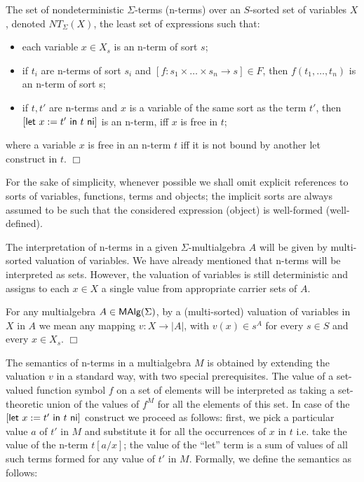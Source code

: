 \begin{Definition} 
The set of nondeterministic $\Sigma$-terms (n-terms) over an $S$-sorted 
set of variables $X$, denoted $NT_\Sigma(X)$, the least set of expressions 
such that:
\begin{itemize} 
\item{each variable $x \in X_s$ is an n-term of sort $s$;} 
\item{if $t_i$ are n-terms of sort $s_i$ and 
      $[f:s_1 \times \ldots \times s_n \rightarrow s] \in F$, 
      then $f(t_1, \ldots, t_n)$ is an n-term of sort s;} 
\item{if $t,t'$ are n-terms and $x$ is a variable of the same sort 
      as the term $t'$, then $[{\sf let}\ x := t'\ {\sf in}\ t\ {\sf ni}]$ is an n-term, iff $x$ is 
      free in $t$;}
\end{itemize}
where a variable $x$ is free in an n-term $t$ iff it is not bound by 
another {\sf let} construct in  $t$.
\hfill$\Box$ 
\end{Definition}
%
For the sake of simplicity, whenever possible we shall omit explicit
references to sorts of variables, functions, terms and objects; the
implicit sorts are always assumed to be such that the considered
expression (object) is well-formed (well-defined).

The interpretation of n-terms in a given $\Sigma$-multialgebra $A$
will be given by multi-sorted valuation of variables. We have already
mentioned that n-terms will be interpreted as sets. However, the
valuation of variables is still deterministic and assigns to each $x
\in X$ a single value from appropriate carrier sets of $A$.

\begin{Definition}
For any multialgebra $A\in \mbox{\rm\sf MAlg}(\Sigma)$, by a (multi-sorted)
valuation of variables in $X$ in $A$ we mean any mapping $v: X
\rightarrow |A|$, with $v(x)\in s^{A}$ for every $s\in S$ and every
$x\in X_s$.
\hfill$\Box$ 
\end{Definition}
%
The semantics of n-terms in a multialgebra $M$ is obtained by
extending the valuation $v$ in a standard way, with two special
prerequisites. The value of a set-valued function symbol $f$ on a set
of elements will be interpreted as taking a set-theoretic union of the
values of $f^M$ for all the elements of this set. In case of the
$[{\sf let}\ x := t'\ {\sf in}\ t\ {\sf ni}]$ construct we proceed as follows: first, we pick a
particular value $a$ of $t'$ in $M$ and substitute it for all the
occurrences of $x$ in $t$ i.e. take the value of the n-term $t[a/x]$;
the value of the ``{\sf let}'' term is a sum of values of all such
terms formed for any value of $t'$ in $M$. Formally, we define the
semantics as follows:

